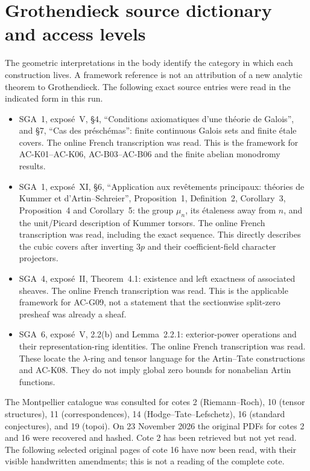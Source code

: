 \documentclass[11pt,a4paper]{article}
\theoremstyle{definition}
\theoremstyle{remark}
\begin{document}
\section{Grothendieck source dictionary and access levels}
\label{sec:groth-source}
The geometric interpretations in the body identify the
category in which each construction lives. A framework
reference is not an attribution of a new analytic theorem
to Grothendieck. The following exact source entries were
read in the indicated form in this run.
\begin{itemize}
\item SGA~1, expos\'e~V, \S4, ``Conditions axiomatiques
d'une th\'eorie de Galois'', and \S7, ``Cas des
pr\'esch\'emas'': finite continuous Galois sets and
finite \'etale covers. The online French transcription
was read. This is the framework for AC-K01--AC-K06,
AC-B03--AC-B06 and the finite abelian monodromy results.
\item SGA~1, expos\'e~XI, \S6, ``Application aux
rev\^etements principaux: th\'eories de Kummer et
d'Artin--Schreier'', Proposition~1, Definition~2,
Corollary~3, Proposition~4 and Corollary~5: the group
$\mu_n$, its \'etaleness away from $n$, and the
unit/Picard description of Kummer torsors. The online
French transcription was read, including the exact
sequence. This directly describes the cubic covers
after inverting $3p$ and their coefficient-field
character projectors.
\item SGA~4, expos\'e~II, Theorem~4.1: existence and
left exactness of associated sheaves. The online
French transcription was read. This is the applicable
framework for AC-G09, not a statement that the
sectionwise split-zero presheaf was already a sheaf.
\item SGA~6, expos\'e~V, 2.2(b) and Lemma~2.2.1:
exterior-power operations and their representation-ring
identities. The online French transcription was read.
These locate the $\lambda$-ring and tensor language
for the Artin--Tate constructions and AC-K08. They
do not imply global zero bounds for nonabelian
Artin functions.
\end{itemize}

The Montpellier catalogue was consulted for cotes 2
(Riemann--Roch), 10 (tensor structures), 11
(correspondences), 14 (Hodge--Tate--Lefschetz), 16
(standard conjectures), and 19 (topoi). On 23 November 2026
the original PDFs for cotes 2 and 16 were recovered and hashed.
Cote 2 has been retrieved but not yet read. The following
selected original pages of cote 16 have now been read, with
their visible handwritten amendments; this is not a reading
of the complete cote.
\end{document}
